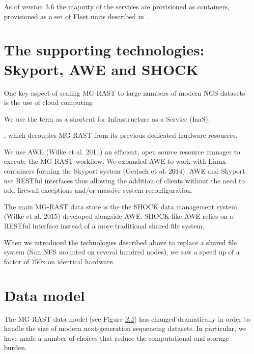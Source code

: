 \documentclass[letterpaper,10pt,english]{sphinxmanual}
\begin{document}
As of version 3.6 the majority of the services are provisioned as
containers, provisioned as a set of Fleet units described in
.


\section{The supporting technologies: Skyport, AWE and SHOCK}
\label{\detokenize{user_manual:the-supporting-technologies-skyport-awe-and-shock}}
One key aspect of scaling MG-RAST to large numbers of modern NGS
datasets is the use of cloud computing %
\begin{footnote}[2]\sphinxAtStartFootnote
We use the term  as a shortcut for Infrastructure as a Service
(IaaS).
%
\end{footnote}, which decouples MG-RAST
from its previous dedicated hardware resources.

We use AWE (Wilke et al. 2011) an efficient, open source resource
manager to execute the MG-RAST workflow. We expanded AWE to work with
Linux containers forming the Skyport system (Gerlach et al. 2014). AWE
and Skyport use RESTful interfaces thus allowing the addition of clients
without the need to add firewall exceptions and/or massive system
reconfiguration.

The main MG-RAST data store is the the SHOCK data management system
(Wilke et al. 2015) developed alongside AWE. SHOCK like AWE relies on a
RESTful interface instead of a more traditional shared file system.

When we introduced the technologies described above to replace a shared
file system (Sun NFS mounted on several hundred nodes), we saw a speed
up of a factor of 750x on identical hardware.


\section{Data model}
\label{\detokenize{user_manual:data-model}}
The MG-RAST data model (see Figure {\hyperref[\detokenize{user_manual:fig:data-model}]{\emph{2.2}}}) has
changed dramatically in order to handle the size of modern
next-generation sequencing datasets. In particular, we have made a
number of choices that reduce the computational and storage burden.
\end{document}
